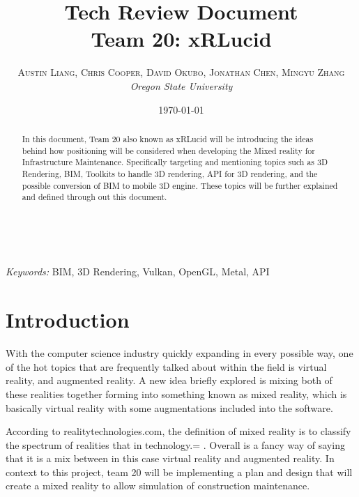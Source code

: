 \documentclass[a4paper, 11pt]{article} %
\title{\textbf{Tech Review Document}\\ %
Team 20: xRLucid} %
\author{\textsc{Austin Liang, Chris Cooper, David Okubo, Jonathan Chen, Mingyu Zhang} %
\\{\textit{Oregon State University}}} %
\date{\today} %
\makeatletter
\renewcommand{\maketitle}{ %
\begin{flushright} %
{\LARGE\@title} %

\vspace{50pt} %

{\large\@author} %
\\\@date %

\vspace{40pt} %
\end{flushright}
}
\makeatother
\begin{document}
\maketitle %



\begin{abstract}
In this document, Team 20 also known as xRLucid will be introducing the ideas behind how positioning will be considered when developing the Mixed reality for Infrastructure Maintenance. Specifically targeting and mentioning topics such as 3D Rendering, BIM, Toolkits to handle 3D rendering, API for 3D rendering, and the possible conversion of BIM to mobile 3D engine. These topics will be further explained and defined through out this document.
\end{abstract}

\hspace*{3,6mm}\textit{Keywords:} BIM, 3D Rendering, Vulkan, OpenGL, Metal, API %

\vspace{30pt} %

\newpage
\tableofcontents
\newpage

\section{Introduction}

	With the computer science industry quickly expanding in every possible way, one of the hot topics that are frequently talked about within the field is virtual reality, and augmented reality. A new idea briefly explored is mixing both of these realities together forming into something known as mixed reality, which is basically virtual reality with some augmentations included into the software.

According to realitytechnologies.com, the definition of mixed reality is to classify the spectrum of realities that in technology.= \cite{RealityTech:2018}. Overall is a fancy way of saying that it is a mix between in this case virtual reality and augmented reality. In context to this project, team 20 will be implementing a plan and design that will create a mixed reality to allow simulation of construction maintenance.
\end{document}
